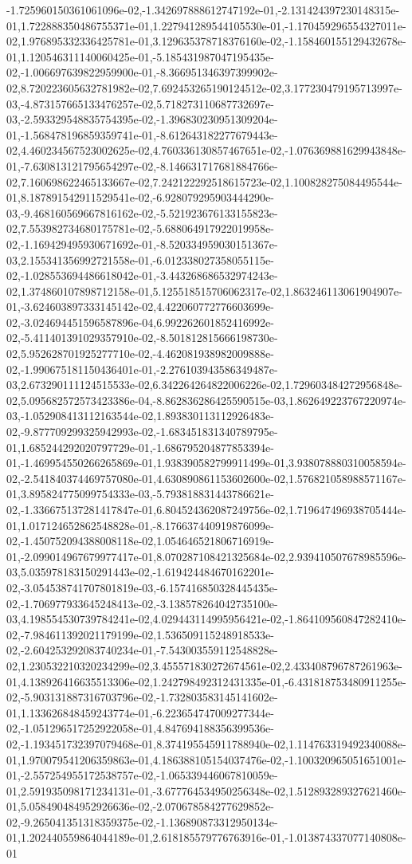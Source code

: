 -1.725960150361061096e-02,-1.342697888612747192e-01,-2.131424397230148315e-01,1.722888350486755371e-01,1.227941289544105530e-01,-1.170459296554327011e-02,1.976895332336425781e-01,3.129635378718376160e-02,-1.158460155129432678e-01,1.120546311140060425e-01,-5.185431987047195435e-02,-1.006697639822959900e-01,-8.366951346397399902e-02,8.720223605632781982e-02,7.692453265190124512e-02,3.177230479195713997e-03,-4.873157665133476257e-02,5.718273110687732697e-03,-2.593329548835754395e-02,-1.396830230951309204e-01,-1.568478196859359741e-01,-8.612643182277679443e-02,4.460234567523002625e-02,4.760336130857467651e-02,-1.076369881629943848e-01,-7.630813121795654297e-02,-8.146631717681884766e-02,7.160698622465133667e-02,7.242122292518615723e-02,1.100828275084495544e-01,8.187891542911529541e-02,-6.928079295903444290e-03,-9.468160569667816162e-02,-5.521923676133155823e-02,7.553982734680175781e-02,-5.688064917922019958e-02,-1.169429495930671692e-01,-8.520334959030151367e-03,2.155341356992721558e-01,-6.012338027358055115e-02,-1.028553694486618042e-01,-3.443268686532974243e-02,1.374860107898712158e-01,5.125518515706062317e-02,1.863246113061904907e-01,-3.624603897333145142e-02,4.422060772776603699e-02,-3.024694451596587896e-04,6.992262601852416992e-02,-5.411401391029357910e-02,-8.501812815666198730e-02,5.952628701925277710e-02,-4.462081938982009888e-02,-1.990675181150436401e-01,-2.276103943586349487e-03,2.673290111124515533e-02,6.342264264822006226e-02,1.729603484272956848e-02,5.095682572573423386e-04,-8.862836286425590515e-03,1.862649223767220974e-03,-1.052908413112163544e-02,1.893830113112926483e-02,-9.877709299325942993e-02,-1.683451831340789795e-01,1.685244292020797729e-01,-1.686795204877853394e-01,-1.469954550266265869e-01,1.938390582799911499e-01,3.938078880310058594e-02,-2.541840374469757080e-01,4.630890861153602600e-02,1.576821058988571167e-01,3.895824775099754333e-03,-5.793818831443786621e-02,-1.336675137281417847e-01,6.804524362087249756e-02,1.719647496938705444e-01,1.017124652862548828e-01,-8.176637440919876099e-02,-1.450752094388008118e-02,1.054646521806716919e-01,-2.099014967679977417e-01,8.070287108421325684e-02,2.939410507678985596e-03,5.035978183150291443e-02,-1.619424484670162201e-02,-3.054538741707801819e-03,-6.157416850328445435e-02,-1.706977933645248413e-02,-3.138578264042735100e-03,4.198554530739784241e-02,4.029443114995956421e-02,-1.864109560847282410e-02,-7.984611392021179199e-02,1.536509115248918533e-02,-2.604253292083740234e-01,-7.543003559112548828e-02,1.230532210320234299e-02,3.455571830272674561e-02,2.433408796787261963e-01,4.138926416635513306e-02,1.242798492312431335e-01,-6.431818753480911255e-02,-5.903131887316703796e-02,-1.732803583145141602e-01,1.133626848459243774e-01,-6.223654747009277344e-02,-1.051296517252922058e-01,4.847694188356399536e-02,-1.193451732397079468e-01,8.374195545911788940e-02,1.114763319492340088e-01,1.970079541206359863e-01,4.186388105154037476e-02,-1.100320965051651001e-01,-2.557254955172538757e-02,-1.065339446067810059e-01,2.591935098171234131e-01,-3.677764534950256348e-02,1.512893289327621460e-01,5.058490484952926636e-02,-2.070678584277629852e-02,-9.265041351318359375e-02,-1.136890873312950134e-01,1.202440559864044189e-01,2.618185579776763916e-01,-1.013874337077140808e-01
